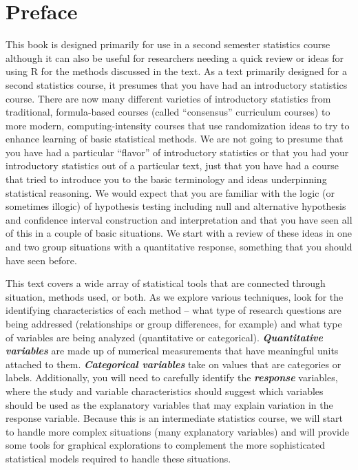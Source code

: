 \documentclass[]{article}
\title{}
\author{}
\date{}
\begin{document}
{
\setcounter{tocdepth}{2}
\tableofcontents
}
\section{Preface}\label{preface}

This book is designed primarily for use in a second semester statistics
course although it can also be useful for researchers needing a quick
review or ideas for using R for the methods discussed in the text. As a
text primarily designed for a second statistics course, it presumes that
you have had an introductory statistics course. There are now many
different varieties of introductory statistics from traditional,
formula-based courses (called ``consensus'' curriculum courses) to more
modern, computing-intensity courses that use randomization ideas to try
to enhance learning of basic statistical methods. We are not going to
presume that you have had a particular ``flavor'' of introductory
statistics or that you had your introductory statistics out of a
particular text, just that you have had a course that tried to introduce
you to the basic terminology and ideas underpinning statistical
reasoning. We would expect that you are familiar with the logic (or
sometimes illogic) of hypothesis testing including null and alternative
hypothesis and confidence interval construction and interpretation and
that you have seen all of this in a couple of basic situations. We start
with a review of these ideas in one and two group situations with a
quantitative response, something that you should have seen before.

This text covers a wide array of statistical tools that are connected
through situation, methods used, or both. As we explore various
techniques, look for the identifying characteristics of each method --
what type of research questions are being addressed (relationships or
group differences, for example) and what type of variables are being
analyzed (quantitative or categorical). \textbf{\emph{Quantitative
variables}} are made up of numerical measurements that have meaningful
units attached to them. \textbf{\emph{Categorical variables}} take on
values that are categories or labels. Additionally, you will need to
carefully identify the \textbf{\emph{response}} variables, where the
study and variable characteristics should suggest which variables should
be used as the explanatory variables that may explain variation in the
response variable. Because this is an intermediate statistics course, we
will start to handle more complex situations (many explanatory
variables) and will provide some tools for graphical explorations to
complement the more sophisticated statistical models required to handle
these situations.
\end{document}
